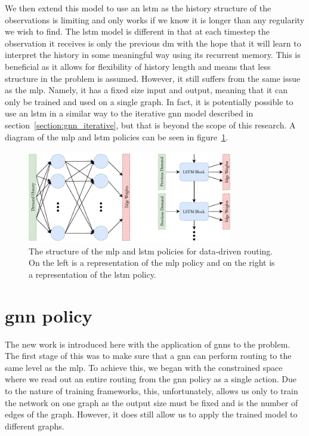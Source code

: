We then extend this model to use an \acf{lstm}\cite{hochreiter1997long} as the history structure of the observations is limiting and only works if we know it is longer than any regularity we wish to find. The \ac{lstm} model is different in that at each timestep the observation it receives is only the previous \ac{dm} with the hope that it will learn to interpret the history in some meaningful way using its recurrent memory. This is beneficial as it allows for flexibility of history length and means that less structure in the problem is assumed. However, it still suffers from the same issue as the \ac{mlp}. Namely, it has a fixed size input and output, meaning that it can only be trained and used on a single graph. In fact, it is potentially possible to use an \ac{lstm} in a similar way to the iterative \ac{gnn} model described in section~\ref{section:gnn_iterative}, but that is beyond the scope of this research. A diagram of the \ac{mlp} and \ac{lstm} policies can be seen in figure~\ref{fig:mlp_lstm}.

\begin{figure}
    \centering
    \includegraphics[width=0.8\textwidth]{figures/mlp_lstm.pdf}
    \caption{The structure of the \ac{mlp} and \ac{lstm} policies for data-driven routing. On the left is a representation of the \ac{mlp} policy and on the right is a representation of the \ac{lstm} policy.}
    \label{fig:mlp_lstm}
\end{figure}


\section{\acs{gnn} policy}
\label{section:gnn_policy}
The new work is introduced here with the application of \acp{gnn} to the problem. The first stage of this was to make sure that a \ac{gnn} can perform routing to the same level as the \ac{mlp}. To achieve this, we began with the constrained space where we read out an entire routing from the \ac{gnn} policy as a single action. Due to the nature of training frameworks, this, unfortunately, allows us only to train the network on one graph as the output size must be fixed and is the number of edges of the graph. However, it does still allow us to apply the trained model to different graphs.

